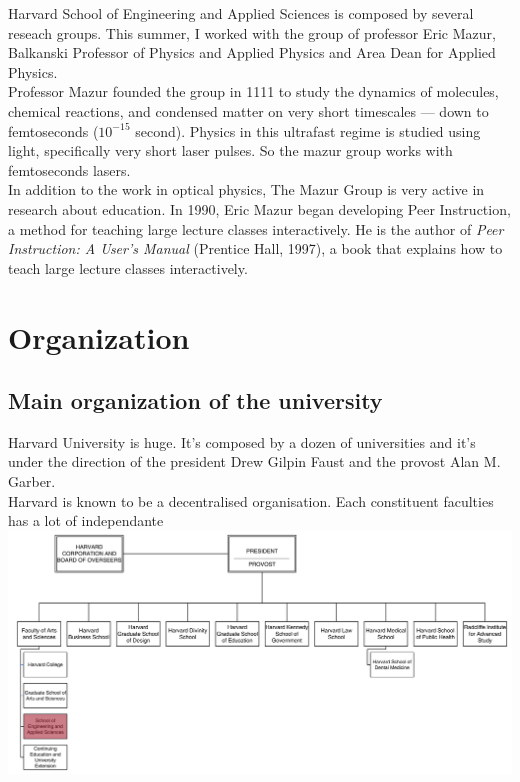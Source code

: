 \documentclass[10pt,a4paper]{article}
\newcommand{\hseas}{Harvard School of Engineering and Applied Sciences}
\begin{document}
\hseas{} is composed by several reseach groups. This summer, I worked with the group of professor Eric Mazur, Balkanski Professor of Physics and Applied Physics and Area Dean for Applied Physics.\\
Professor Mazur founded the group in 1111%
to study the dynamics of molecules, chemical reactions, and condensed matter on very short timescales — down to femtoseconds ($10^{-15}$ second). Physics in this ultrafast regime is studied using light, specifically very short laser pulses. So the mazur group works with femtoseconds lasers.\\
In addition to the work in optical physics, The Mazur Group is very active in research about education. In 1990, Eric Mazur began developing Peer Instruction, a method for teaching large lecture classes interactively. He is the author of \textit{Peer Instruction: A User's Manual} (Prentice Hall, 1997), a book that explains how to teach large lecture classes interactively.

\newpage
\section{Organization}
\subsection{Main organization of the university}
Harvard University is huge. It's composed by a dozen of universities and it's under the direction of the president Drew Gilpin Faust and the provost Alan M. Garber.\\

Harvard is known to be a decentralised organisation. Each constituent faculties has a lot of independante
\includegraphics[width=1\textwidth]{images/chart1.png}
\end{document}
